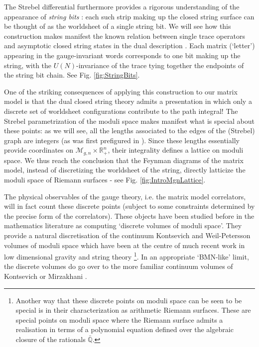 \documentclass[english]{article}
\renewcommand{\>}{\rangle}
\newcommand{\<}{\langle}
\renewcommand{\(}{\left(}
\renewcommand{\)}{\right)}
\begin{document}
The Strebel differential furthermore provides a rigorous understanding of the appearance of {\it string bits} \cite{KogutBits,Klebanov-susskind,Thorn:1991fv}: each such strip making up the closed string surface can be thought of as the worldsheet of a single string bit. We will see how this construction makes manifest the known relation between single trace operators and asymptotic closed string states in the dual description \cite{Polyakovbook}. Each matrix (`letter') appearing in the gauge-invariant words corresponds to one bit making up the string, with the $U(N)$-invariance of the trace tying together the endpoints of the string bit chain. See Fig. \ref{fig:StringBits}.  

 One of the striking consequences of applying this construction to our matrix model is that the dual closed string theory admits a presentation in which only a discrete set of worldsheet configurations contribute to the path integral! The Strebel parametrization of the moduli space makes manifest what is special about these points: as we will see, all the lengths associated to the edges of the (Strebel) graph are integers (as was first prefigured in \cite{razamatGauss}). Since these lengths essentially provide coordinates on $\mathcal{M}_{g,n} \times \mathbb{R}_{+}^{n}$, their integrality defines a lattice on moduli space. We thus reach the conclusion that the Feynman diagrams of the matrix model, instead of discretizing the worldsheet of the string, directly latticize the moduli space of Riemann surfaces - see Fig. \ref{fig:IntroMgnLattice}.  

The physical observables of the gauge theory, i.e. the matrix model correlators, will in fact count these discrete points (subject to some constraints determined by the precise form of the correlators). These objects have been studied before in the mathematics literature as computing `discrete volumes of moduli space'. They provide a natural discretisation of the continuum Kontsevich and Weil-Petersson volumes of moduli space \cite{ChekovNorb, NorbStringVols, OkuyamaDiscWP} which have been at the centre of much recent work in low dimensional gravity and string theory \cite{SSSJTmatrix,LowensteinVolsTR,VirMinString,MaloneyWP,WittenVolsReview,NorburySuperVols,BlommaertDSSYK,JohnsonVols}\footnote{Another way that these discrete points on moduli space can be seen to be special is in their characterization as arithmetic Riemann surfaces. These are special points on moduli space where the Riemann surface admits a realisation in terms of a polynomial equation defined over the algebraic closure of the rationals $\bar{\mathbb{Q}}$.}.
In an appropriate `BMN-like' limit, the discrete volumes do go over to the more familiar continuum volumes of Kontsevich \cite{KontsevichAiry} or Mirzakhani \cite{Mirzakhani,Eynard:2007kz}.
\end{document}
